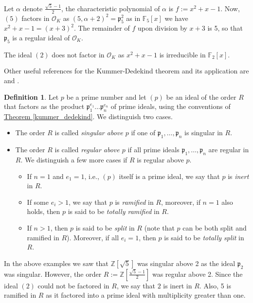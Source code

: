 \documentclass[openany, a4paper, 10pt]{book}
\theoremstyle{plain}
\theoremstyle{plain}
\theoremstyle{plain}
\theoremstyle{definition}
\newtheorem{definition}[theorem]{Definition}
\theoremstyle{plain}
\theoremstyle{definition}
\theoremstyle{remark}
\newcommand{\theoref}[1]{\hyperref[#1]{Theorem \ref{#1}}}
\begin{document}
\begin{examplebox}
    Let $\alpha$ denote $\frac{\sqrt{5}-1}{2}$,
    the characteristic polynomial of $\alpha$ is $f:=x^2+x-1$.
    Now, $(5)$ factors in $\mathcal O_K$ as $(5, \alpha+2)^2 = \mathfrak p_5^2$
    as in $\mathbb F_5[x]$ we have $x^2+x-1 = (x+3)^2$.
    The remainder of $f$ upon division by $x+3$ is 5, so that $\mathfrak p_5$ is a regular ideal of $\mathcal O_K$.

    The ideal $(2)$ does not factor in $\mathcal O_K$ as $x^2+x-1$ is irreducible in $\mathbb F_2[x]$.

    \tcbline
    Other useful references for the Kummer-Dedekind theorem and its application are \cite{Conrad_factoring_dedekind} and \cite[\S~3,\S~7]{ANT_dictaat}.
\end{examplebox}

\begin{definition}
    Let $p$ be a prime number and let $(p)$ be an ideal of the order $R$ that factors as the product $\mathfrak p_1^{e_1} \dots \mathfrak p_n^{e_n}$ of prime ideals, using the conventions of \theoref{kummer_dedekind}. We distinguish two cases.
    \begin{itemize}
        \item The order $R$ is called \textit{singular above $p$} if one of $\mathfrak p_1, \dots, \mathfrak p_n$ is singular in $R$.
        \item The order $R$ is called \textit{regular above $p$} if all prime ideals $\mathfrak p_1, \dots, \mathfrak p_n$ are regular in $R$. We distinguish a few more cases if $R$ is regular above $p$.
            \begin{itemize}
                \item If $n=1$ and $e_1=1$, i.e., $(p)$ itself is a prime ideal, we say that $p$ is \textit{inert} in $R$.
                \item If some $e_i > 1$, we say that $p$ is \textit{ramified} in $R$, moreover, if $n=1$ also holds, then $p$ is said to be \textit{totally ramified} in $R$.
                \item If $n>1$, then $p$ is said to be \textit{split} in $R$ (note that $p$ can be both split and ramified in $R$). Moreover, if all $e_i=1$, then $p$ is said to be \textit{totally split} in $R$.
            \end{itemize}
    \end{itemize}
\end{definition}
In the above examples we saw that
$\mathbb Z[\sqrt{5}]$ was singular above 2 as the ideal $\mathfrak p_2$ was singular.
However, the order $R:=\mathbb Z[\frac{\sqrt{5}-1}{2}]$ was regular above 2.
Since the ideal $(2)$ could not be factored in $R$, we say that $2$ is inert in $R$.
Also, 5 is ramified in $R$ as it factored into a prime ideal with multiplicity greater than one.
\end{document}
